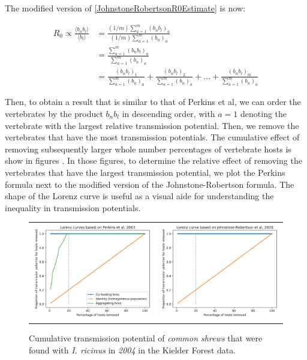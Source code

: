 \documentclass{article}
\begin{document}
The modified version of \eqref{JohnstoneRobertsonR0Estimate} is now:
 
\begin{align}
	R_0 \propto \frac{\langle b_n b_l \rangle}{\langle b_l \rangle} &= \frac{(1/m)\sum_{a=1}^m (b_n b_l)_a}{(1/m)\sum_{a=1}^m (b_n)_a} \nonumber \\ 
																	&= \frac{\sum_{a=1}^m (b_n b_l )_a}{\sum_{a=1}^m (b_n)_a} \nonumber \\ 
																	&= \frac{(b_n b_l)_1}{\sum_{a=1}^m (b_n)_a} + \frac{(b_n b_l)_2}{\sum_{a=1}^m (b_n)_a} + ... + \frac{(b_n b_l)_m}{\sum_{a=1}^m (b_n)_a}
\end{align}

Then, to obtain a result that is similar to that of Perkins et al, we can order the vertebrates by the product $ b_n b_l $ in descending order, with $ a=1 $ denoting the vertebrate with the largest relative transmission potential. Then, we remove the vertebrates that have the most transmission potentials. The cumulative effect of removing subsequently larger whole number percentages of vertebrate hosts is show in figures . In those figures, to determine the relative effect of removing the vertebrates that have the largest transmission potential, we plot the Perkins formula next to the modified version of the Johnstone-Robertson formula. The shape of the Lorenz curve is useful as a visual aide for understanding the inequality in transmission potentials. 

\begin{figure}[h!]
	\centering
	\begin{tabular}{ll}
		\includegraphics[width=.48\linewidth,valign=m]{lorenz_perkins_SA_2004_I.Ricinus} & \includegraphics[width=.48\linewidth,valign=m]{lorenz_JR_SA_2004_I.Ricinus} \\
	\end{tabular}
	\caption{Cumulative transmission potential of \textit{common shrews} that were found with \textit{I.  ricinus} in \textit{2004} in the Kielder Forest data.}
	\label{fig:lorenz_2004_itrianguliceps_FV}
\end{figure}
\end{document}
